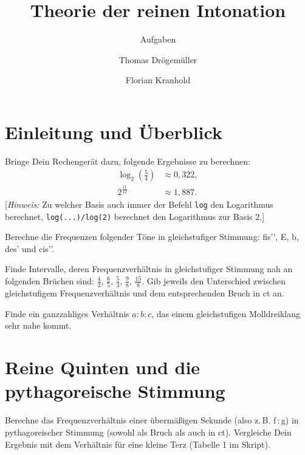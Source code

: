 \documentclass[ngerman,11pt]{scrartcl}
\title     {Theorie der reinen Intonation}
\author    {Thomas Drögemüller\and Florian Kranhold}
\subtitle  {Aufgaben}
\begin{document}
\maketitle

\section{Einleitung und Überblick}

\begin{aufg}
  Bringe Dein Rechengerät dazu, folgende Ergebnisse zu berechnen:
  \begin{align*}
    \log_2(\tfrac54) &\approx 0{,}322,\\
    2^{\frac{11}{12}} &\approx 1{,}887.
  \end{align*}
  [\emph{Hinweis:} Zu welcher Basis auch immer der Befehl \texttt{log} den Logarithmus
  berechnet, \texttt{log(...)/log(2)} berechnet den Logarithmus zur Basis $2$.]
\end{aufg}

\begin{aufg}
  Berechne die Frequenzen folgender Töne in gleichstufiger Stimmung: fis’’, E,
  b, des’ und cis’’.
\end{aufg}

\begin{aufg}
  Finde Intervalle, deren Frequenzverhältnis in gleichstufiger Stimmung nah an
  folgenden Brüchen sind: $\frac43$, $\frac65$, $\frac53$, $\frac98$,
  $\frac{15}8$. Gib jeweils den Unterschied zwischen gleichstufigem
  Frequenzverhältnis und dem entsprechenden Bruch in ct an.
\end{aufg}

\begin{aufg}
  Finde ein ganzzahliges Verhältnis $a:b:c$, das einem gleichstufigen
  Molldreiklang sehr nahe kommt.
\end{aufg}

\section{Reine Quinten und die pythagoreische Stimmung}

\begin{aufg}
  Berechne das Frequenzverhältnis einer übermäßigen Sekunde (also
  z.\,B. f\,:\,\sharp g) in pythagoreischer Stimmung (sowohl als Bruch als auch
  in ct). Vergleiche Dein Ergebnis mit dem Verhältnis für eine kleine Terz
  (Tabelle 1 im Skript).
\end{aufg}
\end{document}
